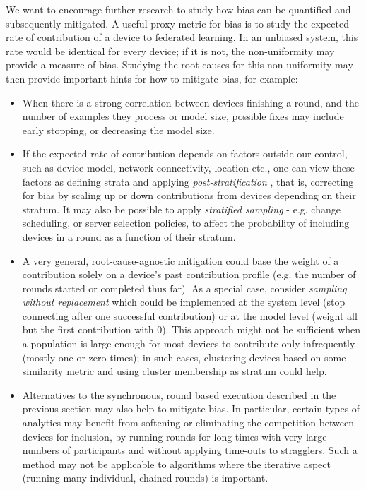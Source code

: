 \documentclass[11pt]{article}
\begin{document}
We want to encourage further research to study how bias can be quantified and subsequently mitigated. A useful proxy metric for bias is to study the expected rate of contribution of a device to federated learning. In an unbiased system, this rate would be identical for every device; if it is not, the non-uniformity may provide a measure of bias. Studying the root causes for this non-uniformity may then provide important hints for how to mitigate bias, for example:
\begin{itemize}
    \item When there is a strong correlation between devices finishing a round, and the number of examples they process or model size, possible fixes may include early stopping, or decreasing the model size.
    \item If the expected rate of contribution depends on factors outside our control, such as device model, network connectivity, location etc., one can view these factors as defining strata and applying \textit{post-stratification} \citep{little1993poststratification}, that is, correcting for bias by scaling up or down contributions from devices depending on their stratum. It may also be possible to apply \textit{stratified sampling} - e.g. change scheduling, or server selection policies, to affect the probability of including devices in a round as a function of their stratum.
    \item A very general, root-cause-agnostic mitigation could base the weight of a contribution solely on a device’s past contribution profile (e.g. the number of rounds started or completed thus far). As a special case, consider \textit{sampling without replacement} which could be implemented at the system level (stop connecting after one successful contribution) or at the model level (weight all but the first contribution with 0). This approach might not be sufficient when a population is large enough for most devices to contribute only infrequently (mostly one or zero times); in such cases, clustering devices based on some similarity metric and using cluster membership as stratum could help.
    \item Alternatives to the synchronous, round based execution described in the previous section may also help to mitigate bias. In particular, certain types of analytics may benefit from softening or eliminating the competition between devices for inclusion, by running rounds for long times with very large numbers of participants and without applying time-outs to stragglers. Such a method may not be applicable to algorithms where the iterative aspect (running many individual, chained rounds) is important.
\end{itemize}
\end{document}
